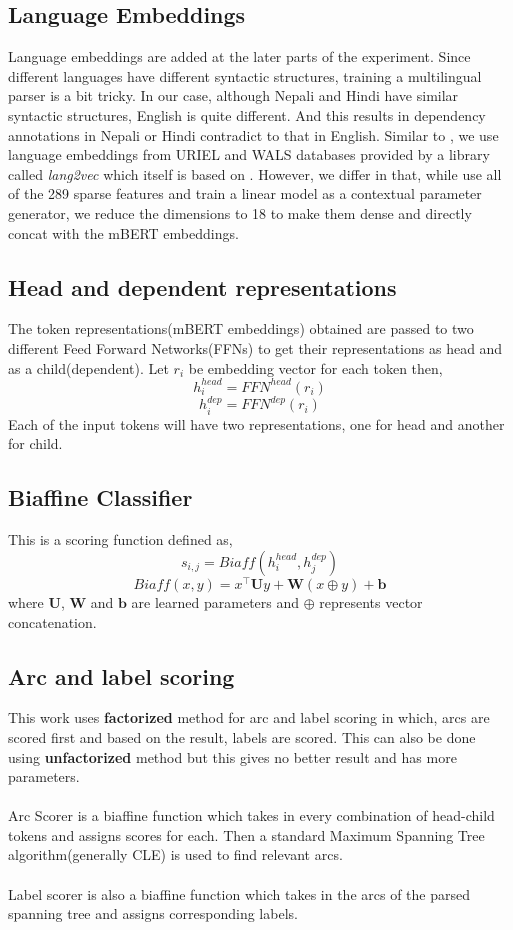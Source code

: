 \subsection{Language Embeddings}
Language embeddings are added at the later parts of the experiment. Since
different languages have different syntactic structures, training a
multilingual parser is a bit tricky. In our case, although Nepali and Hindi
have similar syntactic structures, English is quite different. And this results
in dependency annotations in Nepali or Hindi contradict to that in
English. Similar to \cite{udapter}, we use language embeddings from URIEL and
WALS databases provided by a library called \textit{lang2vec} which itself is
based on \cite{lang2vec}. However, we differ in that, while \cite{udapter} use
all of the 289 sparse features and train a linear model as a contextual
parameter generator, we reduce the dimensions to 18 to make them dense and
directly concat with the mBERT embeddings.

\subsection{Head and dependent representations}
The token representations(mBERT embeddings) obtained are passed to two
different Feed Forward Networks(FFNs) to get their representations as head and
as a child(dependent). Let $r_i$ be embedding vector for each token then,
$$h_i^{head} = FFN^{head}(r_i)$$
$$h_i^{dep} = FFN^{dep}(r_i)$$
Each of the input tokens will have two representations, one for head and another for child.

\subsection{Biaffine Classifier}
This is a scoring function defined as,
$$s_{i,j} = Biaff(h_i^{head}, h_j^{dep})$$
$$Biaff(x, y) = x^\top \textbf{U}y + \textbf{W}(x \oplus y) + \textbf{b}$$
where $\textbf{U}$, $\textbf{W}$ and $\textbf{b}$ are learned parameters and
$\oplus$ represents vector concatenation.

\subsection{Arc and label scoring}
This work uses \textbf{factorized} method for arc and label scoring in which,
arcs are scored first and based on the result, labels are scored. This can also
be done using \textbf{unfactorized} method but this gives no better result and
has more parameters.
\\~\\
Arc Scorer is a biaffine function which takes in every combination of
head-child tokens and assigns scores for each. Then a standard Maximum Spanning
Tree algorithm(generally CLE) is used to find relevant arcs.
\\~\\
Label scorer is also a biaffine function which takes in the arcs of the parsed
spanning tree and assigns corresponding labels.


